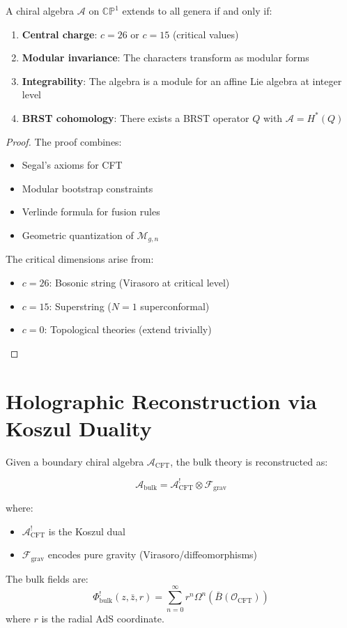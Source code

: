 \begin{theorem}
A chiral algebra $\mathcal{A}$ on $\mathbb{CP}^1$ extends to all genera if and only if:
\begin{enumerate}
\item \textbf{Central charge}: $c = 26$ or $c = 15$ (critical values)
\item \textbf{Modular invariance}: The characters transform as modular forms
\item \textbf{Integrability}: The algebra is a module for an affine Lie algebra at integer level
\item \textbf{BRST cohomology}: There exists a BRST operator $Q$ with $\mathcal{A} = H^*(Q)$
\end{enumerate}
\end{theorem}

\begin{proof}
The proof combines:
\begin{itemize}
\item Segal's axioms for CFT
\item Modular bootstrap constraints
\item Verlinde formula for fusion rules
\item Geometric quantization of $\mathcal{M}_{g,n}$
\end{itemize}

The critical dimensions arise from:
\begin{itemize}
\item $c = 26$: Bosonic string (Virasoro at critical level)
\item $c = 15$: Superstring ($N=1$ superconformal)
\item $c = 0$: Topological theories (extend trivially)
\end{itemize}
\end{proof}

\section{Holographic Reconstruction via Koszul Duality}

\begin{theorem}
Given a boundary chiral algebra $\mathcal{A}_{\text{CFT}}$, the bulk theory is reconstructed as:

$$\mathcal{A}_{\text{bulk}} = \mathcal{A}_{\text{CFT}}^! \otimes \mathcal{F}_{\text{grav}}$$

where:
\begin{itemize}
\item $\mathcal{A}_{\text{CFT}}^!$ is the Koszul dual
\item $\mathcal{F}_{\text{grav}}$ encodes pure gravity (Virasoro/diffeomorphisms)
\end{itemize}

The bulk fields are:
$$\Phi^!_{\text{bulk}}(z, \bar{z}, r) = \sum_{n=0}^\infty r^n \Omega^n(\bar{B}(\mathcal{O}_{\text{CFT}}))$$
where $r$ is the radial AdS coordinate.
\end{theorem}


